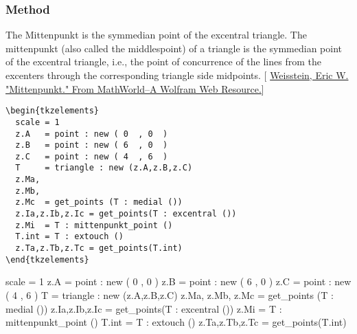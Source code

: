 \subsubsection{Method } %
\label{ssub:method_imeth_triangle_mittenpunkt}

The Mittenpunkt is the symmedian point of the excentral triangle. The mittenpunkt (also called the middlespoint) of a triangle  is the symmedian point of the excentral triangle, i.e., the point of concurrence of the lines from the excenters  through the corresponding triangle side midpoints.
[ \href{https://mathworld.wolfram.com/Mittenpunkt.html}{Weisstein, Eric W. "Mittenpunkt." From MathWorld--A Wolfram Web Resource.}]

\vspace{6pt} 
\begin{minipage}{.5\textwidth}
\begin{Verbatim}
\begin{tkzelements}
  scale = 1
  z.A   = point : new ( 0  , 0  )
  z.B   = point : new ( 6  , 0  )
  z.C   = point : new ( 4  , 6  )
  T     = triangle : new (z.A,z.B,z.C)
  z.Ma,
  z.Mb,
  z.Mc  = get_points (T : medial ())
  z.Ia,z.Ib,z.Ic = get_points(T : excentral ())
  z.Mi  = T : mittenpunkt_point ()
  T.int = T : extouch ()
  z.Ta,z.Tb,z.Tc = get_points(T.int)
\end{tkzelements}
\end{Verbatim}
\end{minipage}
\begin{minipage}{.5\textwidth}
\begin{tkzelements}
  scale = 1
  z.A   = point : new ( 0  , 0  )
  z.B   = point : new ( 6  , 0  )
  z.C   = point : new ( 4  , 6  )
  T     = triangle : new (z.A,z.B,z.C)
  z.Ma,
  z.Mb,
  z.Mc = get_points (T : medial ())
  z.Ia,z.Ib,z.Ic = get_points(T : excentral ())
  z.Mi            = T : mittenpunkt_point ()
  T.int     = T : extouch ()
  z.Ta,z.Tb,z.Tc = get_points(T.int)
\end{tkzelements}
\begin{center}
\end{center}
\end{minipage}


